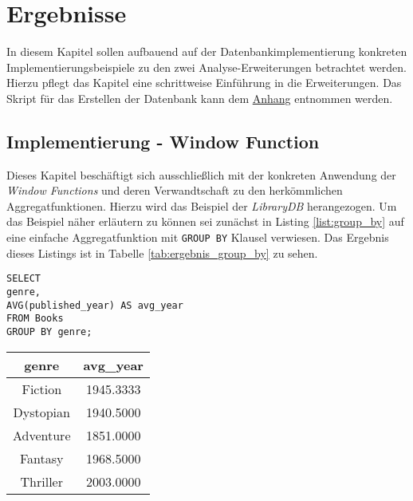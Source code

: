 \chapter{Ergebnisse}
\label{chap:ergebnis} In diesem Kapitel sollen aufbauend auf der Datenbankimplementierung
konkreten Implementierungsbeispiele zu den zwei Analyse-Erweiterungen betrachtet
werden. Hierzu pflegt das Kapitel eine schrittweise Einführung in die
Erweiterungen. Das Skript für das Erstellen der Datenbank kann dem \hyperref[sec:library_db]{Anhang}
entnommen werden.

\section{Implementierung - Window Function}
\label{sec:window_function} Dieses Kapitel beschäftigt sich ausschließlich mit der
konkreten Anwendung der \textit{Window Functions} und deren Verwandtschaft zu
den herkömmlichen Aggregatfunktionen. Hierzu wird das Beispiel der \textit{LibraryDB}
herangezogen. Um das Beispiel näher erläutern zu können sei zunächst in Listing \ref{list:group_by}
auf eine einfache Aggregatfunktion mit \texttt{GROUP BY} Klausel verwiesen. Das Ergebnis
dieses Listings ist in Tabelle \ref{tab:ergebnis_group_by} zu sehen.

\begin{minipage}{0.55\textwidth}
	\begin{lstlisting}
SELECT
genre,
AVG(published_year) AS avg_year
FROM Books
GROUP BY genre;
	\end{lstlisting}
\end{minipage}
\hfill
\begin{minipage}{0.45\textwidth}
	\centering
	\begin{tabular}{|c|c|}
		\hline
		\textbf{genre} & \textbf{avg\_year} \\
		\hline
		Fiction        & 1945.3333          \\
		\hline
		Dystopian      & 1940.5000          \\
		\hline
		Adventure      & 1851.0000          \\
		\hline
		Fantasy        & 1968.5000          \\
		\hline
		Thriller       & 2003.0000          \\
		\hline
	\end{tabular}
	 \label{tab:ergebnis_group_by}
\end{minipage}

